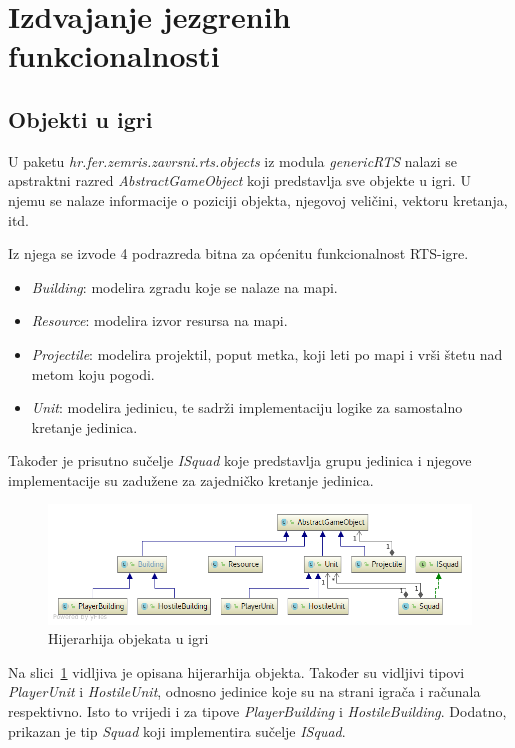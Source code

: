 \documentclass[times, utf8, zavrsni, numeric]{fer}
\begin{document}
\section{Izdvajanje jezgrenih funkcionalnosti}\label{sec:core}

\subsection{Objekti u igri}

\par U paketu \textit{hr.fer.zemris.zavrsni.rts.objects} iz modula \textit{genericRTS} nalazi se apstraktni razred \textit{AbstractGameObject} koji predstavlja sve objekte u igri.
U njemu se nalaze informacije o poziciji objekta, njegovoj veličini, vektoru kretanja, itd.

\par Iz njega se izvode 4 podrazreda bitna za općenitu funkcionalnost RTS-igre.
\begin{itemize}
	\item \textit{Building}: modelira zgradu koje se nalaze na mapi.
	\item \textit{Resource}: modelira izvor resursa na mapi.
	\item \textit{Projectile}: modelira projektil, poput metka, koji leti po mapi i vrši štetu nad metom koju pogodi.
	\item \textit{Unit}: modelira jedinicu, te sadrži implementaciju logike za samostalno kretanje jedinica. 
\end{itemize}
Također je prisutno sučelje \textit{ISquad} koje predstavlja grupu jedinica i njegove implementacije su zadužene za zajedničko kretanje jedinica.

\begin{figure}[h]
	\centering
	\includegraphics[width=0.8\linewidth]{images/umlObjects.png}
	\caption{Hijerarhija objekata u igri}
	\label{fig:umlObjects}
\end{figure}

\par Na slici~\ref{fig:umlObjects} vidljiva je opisana hijerarhija objekta.
Također su vidljivi tipovi \textit{PlayerUnit} i \textit{HostileUnit}, odnosno jedinice koje su na strani igrača i računala respektivno.
Isto to vrijedi i za tipove \textit{PlayerBuilding} i \textit{HostileBuilding}.
Dodatno, prikazan je tip \textit{Squad} koji implementira sučelje \textit{ISquad}.
\end{document}
